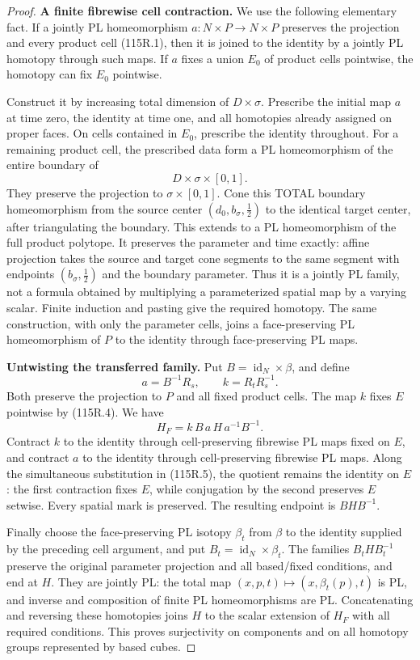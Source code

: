 \begin{proof}
\textbf{A finite fibrewise cell contraction.}
We use the following elementary fact. If a jointly PL homeomorphism \(a:N\times P\to N\times P\) preserves the projection and every product cell (115R.1), then it is joined to the identity by a jointly PL homotopy through such maps. If \(a\) fixes a union \(E_0\) of product cells pointwise, the homotopy can fix \(E_0\) pointwise.

Construct it by increasing total dimension of \(D\times\sigma\). Prescribe the initial map \(a\) at time zero, the identity at time one, and all homotopies already assigned on proper faces. On cells contained in \(E_0\), prescribe the identity throughout. For a remaining product cell, the prescribed data form a PL homeomorphism of the entire boundary of
\[
 D\times\sigma\times[0,1].
\]
They preserve the projection to \(\sigma\times[0,1]\). Cone this TOTAL boundary homeomorphism from the source center
\((d_0,b_\sigma,\tfrac12)\) to the identical target center, after triangulating the boundary. This extends to a PL homeomorphism of the full product polytope. It preserves the parameter and time exactly: affine projection takes the source and target cone segments to the same segment with endpoints \((b_\sigma,\tfrac12)\) and the boundary parameter. Thus it is a jointly PL family, not a formula obtained by multiplying a parameterized spatial map by a varying scalar. Finite induction and pasting give the required homotopy. The same construction, with only the parameter cells, joins a face-preserving PL homeomorphism of \(P\) to the identity through face-preserving PL maps.

\textbf{Untwisting the transferred family.}
Put \(B=\operatorname{id}_N\times\beta\), and define
\[
 a=B^{-1}R_s,\qquad k=R_tR_s^{-1}.
\]
Both preserve the projection to \(P\) and all fixed product cells. The map \(k\) fixes \(E\) pointwise by (115R.4). We have
\[
 H_F=k\,B\,a\,H\,a^{-1}B^{-1}.
 \tag{115R.5}
\]
Contract \(k\) to the identity through cell-preserving fibrewise PL maps fixed on \(E\), and contract \(a\) to the identity through cell-preserving fibrewise PL maps. Along the simultaneous substitution in (115R.5), the quotient remains the identity on \(E\): the first contraction fixes \(E\), while conjugation by the second preserves \(E\) setwise. Every spatial mark is preserved. The resulting endpoint is \(BHB^{-1}\).

Finally choose the face-preserving PL isotopy \(\beta_t\) from \(\beta\) to the identity supplied by the preceding cell argument, and put \(B_t=\operatorname{id}_N\times\beta_t\). The families \(B_tHB_t^{-1}\) preserve the original parameter projection and all based/fixed conditions, and end at \(H\). They are jointly PL: the total map \((x,p,t)\mapsto(x,\beta_t(p),t)\) is PL, and inverse and composition of finite PL homeomorphisms are PL. Concatenating and reversing these homotopies joins \(H\) to the scalar extension of \(H_F\) with all required conditions. This proves surjectivity on components and on all homotopy groups represented by based cubes.


\end{proof}
